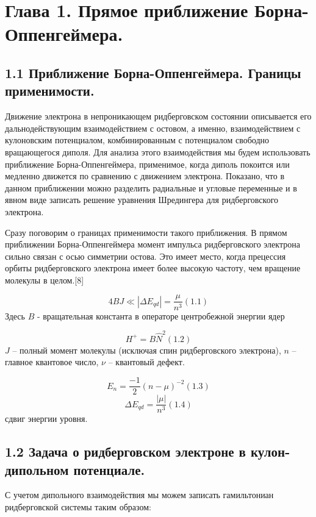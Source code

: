 \section{Глава 1. Прямое
приближение
Борна-Оппенгеймера.}
\subsection{1.1
Приближение Борна-Оппенгеймера. Границы
применимости.}
Движение электрона в непроникающем ридберговском состоянии описывается его дальнодействующим взаимодействием с остовом, а именно, взаимодействием с кулоновским потенциалом, комбинированным с потенциалом свободно вращающегося диполя. Для анализа этого взаимодействия мы будем использовать приближение Борна-Оппенгеймера, применимое, когда диполь покоится или медленно движется по сравнению с движением электрона. Показано, что в данном приближении можно разделить радиальные и угловые переменные и в явном виде записать решение уравнения Шредингера для ридберговского электрона.

Сразу поговорим о границах применимости такого приближения. В прямом приближении Борна-Оппенгеймера момент импульса ридберговского электрона сильно связан с осью симметрии остова. Это имеет место, когда прецессия орбиты ридберговского электрона имеет более высокую частоту, чем вращение молекулы в целом.[8]

\begin{equation*}
4\mathit{BJ}{\ll}\left|{\Delta}E_{\mathit{qd}}\right|=\frac{\mu }{n^3}(1.1)
\end{equation*}
Здесь  $B$ -
вращательная константа в операторе центробежной энергии ядер

\begin{equation*}
	H^{+}=B\widehat  N^2(1.2)
\end{equation*}
$J$ -- полный момент молекулы (исключая спин ридберговского электрона),
$n$ -- главное квантовое число,
$\nu$ -- квантовый дефект.

\begin{equation*}
E_n=\frac{-1} 2\left(n-\mu \right)^{-2}(1.3)
\end{equation*}
\begin{equation*}
{\Delta}E_{\mathit{qd}}= \frac {|\mu|} {n^3}(1.4)
\end{equation*}
сдвиг энергии уровня.

\subsection{1.2 Задача о
ридберговском электроне в кулон-дипольном
потенциале.}
С учетом дипольного взаимодействия мы можем записать гамильтониан ридберговской системы таким образом:

